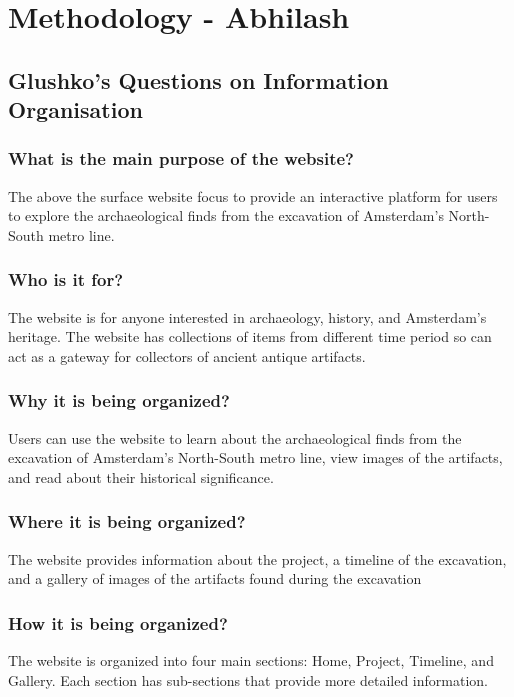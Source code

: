 \section {Methodology - Abhilash}

\subsection{Glushko's Questions on Information Organisation}

\subsubsection{What is the main purpose of the website?}
The above the surface website focus to provide an interactive platform for users to explore the archaeological finds from the excavation of Amsterdam’s North-South metro line.

\subsubsection{Who is it for?}
The website is for anyone interested in archaeology, history, and Amsterdam’s heritage. The website has collections of items from different time period so can act as a gateway for collectors of ancient antique artifacts.

\subsubsection{Why it is being organized?}
Users can use the website to learn about the archaeological finds from the excavation of Amsterdam’s North-South metro line, view images of the artifacts, and read about their historical significance.

\subsubsection{Where it is being organized?}
The website provides information about the project, a timeline of the excavation, and a gallery of images of the artifacts found during the excavation

\subsubsection{How it is being organized?}
The website is organized into four main sections: Home, Project, Timeline, and Gallery. Each section has sub-sections that provide more detailed information.

